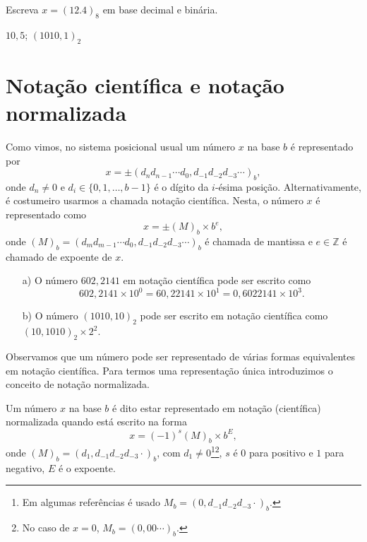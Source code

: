 \begin{exer} Escreva $x=(12.4)_8$ em base decimal e binária.
\end{exer}
\begin{resp}
  
    $10,5$; $(1010,1)_2$
  
\end{resp}

\section{Notação científica e notação normalizada}

Como vimos, no sistema posicional usual um número $x$ na base $b$ é representado por
\begin{equation*}
  x = \pm (d_{n}d_{n-1}\cdots d_{0},d_{-1}d_{-2}d_{-3}\cdots)_b,
\end{equation*}
onde $d_{n}\neq 0$ e $d_i\in\{0, 1, \dotsc, b-1\}$ é o dígito da $i$-ésima posição. Alternativamente, é costumeiro usarmos a chamada notação científica. Nesta, o número $x$ é representado como
\begin{equation*}
  x = \pm (M)_b\times b^e,
\end{equation*}
onde $(M)_b = (d_{m}d_{m-1}\cdots d_{0},d_{-1}d_{-2}d_{-3}\cdots)_b$ é chamada de mantissa e $e\in\mathbb{Z}$ é chamado de expoente de $x$.

\begin{ex}
  \begin{itemize}
  \item[a)] O número $602,2141$ em notação científica pode ser escrito como
    \begin{equation*}
      602,2141\times 10^0 = 60,22141\times 10^{1} = 0,6022141\times 10^{3}.
    \end{equation*}
  \item[b)] O número $(1010,10)_2$ pode ser escrito em notação científica como $(10,1010)_2\times 2^2$.
  \end{itemize}
\end{ex}

Observamos que um número pode ser representado de várias formas equivalentes em notação científica. Para termos uma representação única introduzimos o conceito de notação normalizada.

\begin{defn}
  Um número $x$ na base $b$ é dito estar representado em notação (científica) normalizada quando está escrito na forma
  \begin{equation*}
    x=(-1)^{s}(M)_b \times b^{E},
  \end{equation*}
onde $(M)_b = (d_1,d_{-1}d_{-2}d_{-3}\cdot)_b$, com $d_{1}\neq 0$\footnote{Em algumas referências é usado $M_b = (0,d_{-1}d_{-2}d_{-3}\cdot)_b$.}\footnote{No caso de $x=0$, $M_b = (0,00\cdots)_b$.}, $s$ é $0$ para positivo e $1$ para negativo, $E$ é o expoente.
 \end{defn}

